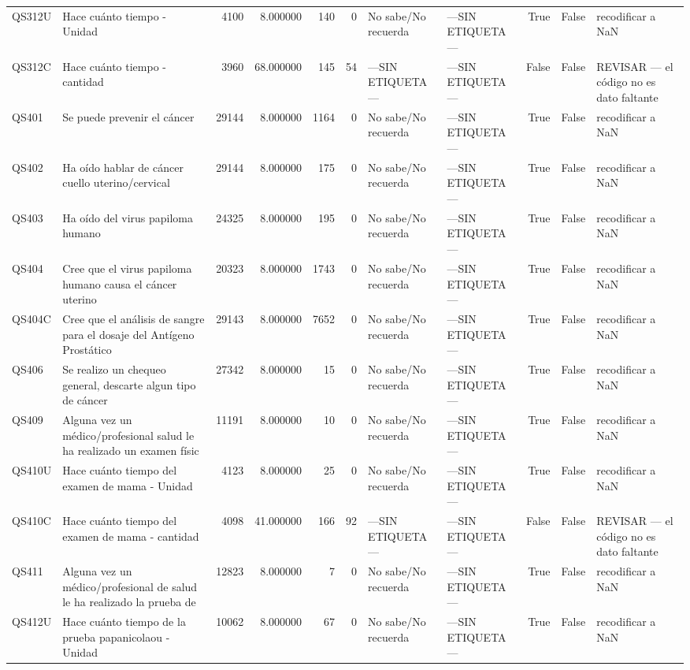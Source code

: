 \begin{longtable}{llrrrrllrrl}
QS312U & Hace cuánto tiempo - Unidad & 4100 & 8.000000 & 140 & 0 & No sabe/No recuerda & —SIN ETIQUETA— & True & False & recodificar a NaN \\
QS312C & Hace cuánto tiempo - cantidad & 3960 & 68.000000 & 145 & 54 & —SIN ETIQUETA— & —SIN ETIQUETA— & False & False & REVISAR — el código no es dato faltante \\
QS401 & Se puede prevenir el cáncer & 29144 & 8.000000 & 1164 & 0 & No sabe/No recuerda & —SIN ETIQUETA— & True & False & recodificar a NaN \\
QS402 & Ha oído hablar de cáncer cuello uterino/cervical & 29144 & 8.000000 & 175 & 0 & No sabe/No recuerda & —SIN ETIQUETA— & True & False & recodificar a NaN \\
QS403 & Ha oído del virus papiloma humano & 24325 & 8.000000 & 195 & 0 & No sabe/No recuerda & —SIN ETIQUETA— & True & False & recodificar a NaN \\
QS404 & Cree que el virus papiloma humano causa el cáncer uterino & 20323 & 8.000000 & 1743 & 0 & No sabe/No recuerda & —SIN ETIQUETA— & True & False & recodificar a NaN \\
QS404C & Cree que el análisis de sangre para el dosaje del Antígeno Prostático  & 29143 & 8.000000 & 7652 & 0 & No sabe/No recuerda & —SIN ETIQUETA— & True & False & recodificar a NaN \\
QS406 & Se realizo un chequeo general, descarte algun tipo de cáncer & 27342 & 8.000000 & 15 & 0 & No sabe/No recuerda & —SIN ETIQUETA— & True & False & recodificar a NaN \\
QS409 & Alguna vez un médico/profesional salud le ha realizado un examen físic & 11191 & 8.000000 & 10 & 0 & No sabe/No recuerda & —SIN ETIQUETA— & True & False & recodificar a NaN \\
QS410U & Hace cuánto tiempo del examen de mama - Unidad & 4123 & 8.000000 & 25 & 0 & No sabe/No recuerda & —SIN ETIQUETA— & True & False & recodificar a NaN \\
QS410C & Hace cuánto tiempo del examen de mama - cantidad & 4098 & 41.000000 & 166 & 92 & —SIN ETIQUETA— & —SIN ETIQUETA— & False & False & REVISAR — el código no es dato faltante \\
QS411 & Alguna vez un médico/profesional de salud le ha realizado la prueba de & 12823 & 8.000000 & 7 & 0 & No sabe/No recuerda & —SIN ETIQUETA— & True & False & recodificar a NaN \\
QS412U & Hace cuánto tiempo de la prueba papanicolaou - Unidad & 10062 & 8.000000 & 67 & 0 & No sabe/No recuerda & —SIN ETIQUETA— & True & False & recodificar a NaN \\

\end{longtable}
